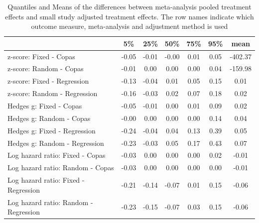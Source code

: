 \documentclass[11pt,a4paper,twoside]{book}\usepackage[]{graphicx}\usepackage[]{color}
\begin{document}
\begin{table}[ht]
\centering
\begingroup\scriptsize
\begin{tabular}{lcccccc}
  \hline
 & 5\% & 25\% & 50\% & 75\% & 95\% & mean \\ 
  \hline
z-score: Fixed - Copas & -0.05 & -0.01 & -0.00 & 0.01 & 0.05 & -402.37 \\ 
  z-score: Random - Copas & -0.01 & 0.00 & 0.00 & 0.00 & 0.04 & -159.98 \\ 
  z-score: Fixed - Regression & -0.13 & -0.04 & 0.01 & 0.05 & 0.15 & 0.01 \\ 
  z-score: Random - Regression & -0.16 & -0.03 & 0.02 & 0.07 & 0.18 & 0.02 \\ 
  Hedges g: Fixed - Copas & -0.05 & -0.01 & 0.00 & 0.01 & 0.09 & 0.02 \\ 
  Hedges g: Random - Copas & -0.00 & 0.00 & 0.00 & 0.00 & 0.14 & 0.04 \\ 
  Hedges g: Fixed - Regression & -0.24 & -0.04 & 0.04 & 0.13 & 0.39 & 0.05 \\ 
  Hedges g: Random - Regression & -0.23 & -0.03 & 0.05 & 0.17 & 0.43 & 0.07 \\ 
  Log hazard ratio: Fixed - Copas & -0.03 & 0.00 & 0.00 & 0.00 & 0.02 & -0.01 \\ 
  Log hazard ratio: Random - Copas & -0.03 & 0.00 & 0.00 & 0.00 & 0.00 & -0.01 \\ 
  Log hazard ratio: Fixed - Regression & -0.21 & -0.14 & -0.07 & 0.01 & 0.15 & -0.06 \\ 
  Log hazard ratio: Random - Regression & -0.23 & -0.15 & -0.07 & 0.03 & 0.15 & -0.06 \\ 
   \hline
\end{tabular}
\endgroup
\caption{Quantiles and Means of the differences between meta-analysis pooled treatment effects and small study adjusted treatment effects. The row names indicate which outcome measure, meta-analysis and adjustment method is used} 
\label{adjustment.difference}
\end{table}
\end{document}
